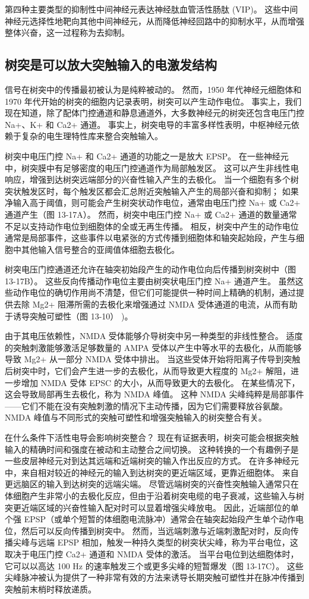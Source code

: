 第四种主要类型的抑制性中间神经元表达神经肽血管活性肠肽 (VIP)。 这些中间神经元选择性地靶向其他中间神经元，从而降低神经回路中的抑制水平，从而增强整体兴奋，这一过程称为去抑制。

\subsection{树突是可以放大突触输入的电激发结构}
信号在树突中的传播最初被认为是纯粹被动的。 然而，1950 年代神经元细胞体和 1970 年代开始的树突的细胞内记录表明，树突可以产生动作电位。 事实上，我们现在知道，除了配体门控通道和静息通道外，大多数神经元的树突还包含电压门控 Na+、K+ 和 Ca2+ 通道。 事实上，树突电导的丰富多样性表明，中枢神经元依赖于复杂的电生理特性库来整合突触输入。

树突中电压门控 Na+ 和 Ca2+ 通道的功能之一是放大 EPSP。 在一些神经元中，树突膜中有足够密度的电压门控通道作为局部触发区。 这可以产生非线性电响应，增强到达树突远端部分的兴奋性输入产生的去极化。 当一个细胞有多个树突状触发区时，每个触发区都会汇总附近突触输入产生的局部兴奋和抑制； 如果净输入高于阈值，则可能会产生树突状动作电位，通常由电压门控 Na+ 或 Ca2+ 通道产生（图 13-17A）。 然而，树突中电压门控 Na+ 或 Ca2+ 通道的数量通常不足以支持动作电位到细胞体的全或无再生传播。 相反，树突中产生的动作电位通常是局部事件，这些事件以电紧张的方式传播到细胞体和轴突起始段，产生与细胞中其他输入信号整合的亚阈值体细胞去极化。

树突电压门控通道还允许在轴突初始段产生的动作电位向后传播到树突树中（图 13-17B）。 这些反向传播动作电位主要由树突状电压门控 Na+ 通道产生。 虽然这些动作电位的确切作用尚不清楚，但它们可能提供一种时间上精确的机制，通过提供去除 Mg2+ 阻滞所需的去极化来增强通过 NMDA 受体通道的电流，从而有助于诱导突触可塑性（图 13-10） )。

由于其电压依赖性，NMDA 受体能够介导树突中另一种类型的非线性整合。 适度的突触刺激能够激活足够数量的 AMPA 受体以产生中等水平的去极化，从而能够导致 Mg2+ 从一部分 NMDA 受体中排出。 当这些受体开始将阳离子传导到突触后树突中时，它们会产生进一步的去极化，从而导致更大程度的 Mg2+ 解阻，进一步增加 NMDA 受体 EPSC 的大小，从而导致更大的去极化。 在某些情况下，这会导致局部再生去极化，称为 NMDA 峰值。 这种 NMDA 尖峰纯粹是局部事件——它们不能在没有突触刺激的情况下主动传播，因为它们需要释放谷氨酸。 NMDA 峰值与不同形式的突触可塑性和增强突触输入的树突整合有关。

在什么条件下活性电导会影响树突整合？ 现在有证据表明，树突可能会根据突触输入的精确时间和强度在被动和主动整合之间切换。 这种转换的一个有趣例子是一些皮层神经元对到达其远端和近端树突的输入作出反应的方式。 在许多神经元中，来自相对较近的神经元的输入到达树突的更近端区域，更靠近细胞体。 来自更远脑区的输入到达树突的远端尖端。 尽管远端树突的兴奋性突触输入通常只在体细胞产生非常小的去极化反应，但由于沿着树突电缆的电子衰减，这些输入与树突更近端区域的兴奋性输入配对时可以显着增强尖峰放电。 因此，近端部位的单个强 EPSP（或单个短暂的体细胞电流脉冲）通常会在轴突起始段产生单个动作电位，然后可以反向传播到树突中。 然而，当远端刺激与近端刺激配对时，反向传播尖峰与远端 EPSP 相加，触发一种持久类型的树突状尖峰，称为平台电位，这取决于电压门控 Ca2+ 通道和 NMDA 受体的激活。 当平台电位到达细胞体时，它可以以高达 100 Hz 的速率触发三个或更多尖峰的短暂爆发（图 13-17C）。 这些尖峰脉冲被认为提供了一种非常有效的方法来诱导长期突触可塑性并在脉冲传播到突触前末梢时释放递质。

